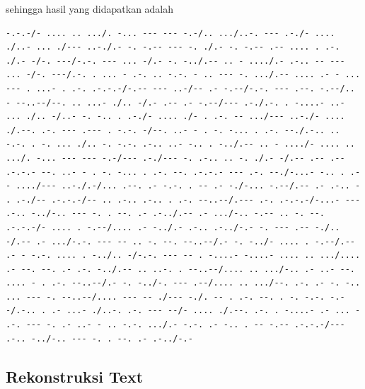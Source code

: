 \documentclass[]{article}
\begin{document}
sehingga hasil yang didapatkan adalah

\begin{lstlisting}
-.-.-/- .... .. .../. -... --- --- -.-/.. .../..-. --- .-./- .... ./..- ... ./--- ..-./.- -. -.-- --- -. ./.- -. -.-- .-- .... . .-. ./.- -/-. ---/-.-. --- ... -/.- -. -../.-- .. - ..../.- .-.. -- --- ... -/-. ---/.-. . ... - .-. .. -.-. - .. --- -. .../.-- .... .- - ... --- . ...- . .-. .-.-.-/-.-- --- ..-/-- .- -.--/-.-. --- .--. -.--/.. - --..--/--. .. ...- ./.. -/.- .-- .- -.--/--- .-./.-. . -....- ..- ... ./.. -/..- -. -.. . .-./- .... ./- . .-. -- .../--- ..-./- .... ./.--. .-. --- .--- . -.-. -/--. ..- - . -. -... . .-. --./.-.. .. -.-. . -. ... ./.. -. -.-. .-.. ..- -.. . -../.-- .. - ..../- .... .. .../. -... --- --- -.-/--- .-./--- -. .-.. .. -. ./.- -/.-- .-- .-- .-.-.- --. ..- - . -. -... . .-. --. .-.-.- --- .-. --./-...- -.. . .- - ..../--- ..-./.-/... .--. .- -.-. . -- .- -./-... -.--/.-- .- .-.. - . .-./-- .-.-.-/-- .. .-.. .-.. . .-. --..--/.--- .-. .-.-.-/-...- --- .-.. -../-.. --- -. . --. .- .-../.-- .- .../-.. -.-- .. -. --. .-.-.-/- .... . -.--/.... .- -../.- .-.. .-../-.- -. --- .-- -./.. -/.-- .- .../-.-. --- -- .. -. --. --..--/.- -. -../- .... . -.--/.-- .- - -.-. .... . -../.. -/-.-. --- -- . -....- -....- .... .. .../.... .- --. --. .- .-. -../.-- .. ..-. . --..--/.... .. .../-.. .- ..- --. .... - . .-. --..--/.- -. -../-. --- .--/.... .. .../--. .-. .- -. -.. ... --- -. --..--/.... --- -- ./--- -./. -- . .-. --. . -. -.-. -.--/.-.. . .- ...- ./..-. .-. --- --/- .... ./.--. .-. . -....- .- ... - .-. --- -. .- ..- - .. -.-. .../.- -.-. .- -.. . -- -.-- .-.-.-/--- .-.. -../-.. --- -. . --. .- .-../-.-
\end{lstlisting}

\subsection{Rekonstruksi Text}
\end{document}
